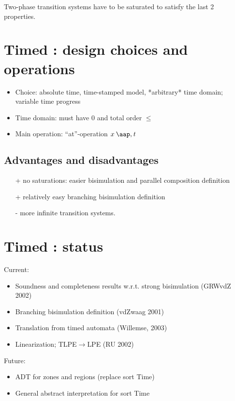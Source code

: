 \begin{slide}
\pause
Two-phase transition systems have to be saturated to satisfy the last 2 properties.
\newslide\section*{Timed \mcrl: design choices and operations}
\begin{itemize}
\item Choice: absolute time, time-stamped model, *arbitrary* time domain; variable time progress
\item Time domain: must have $0$ and total order $\leq$
\item Main operation: ``at''-operation $x\at t$
\end{itemize}
\pause
\subsection*{Advantages and disadvantages}
\begin{itemize}
\item[+] no saturations: easier bisimulation and parallel composition definition
\item[+] relatively easy branching bisimulation definition
\item[-] more infinite transition systems.
\end{itemize}
\newslide\section*{Timed \mcrl: status}
Current:
\begin{itemize}
\item Soundness and completeness results w.r.t. strong bisimulation (GRWvdZ 2002)
\item Branching bisimulation definition (vdZwaag 2001)
\item Translation from timed automata (Willemse, 2003)
\item Linearization; TLPE$\to$LPE (RU 2002)
\end{itemize}
\pause
Future:
\begin{itemize}
\item ADT for zones and regions (replace sort Time)
\item General abstract interpretation for sort Time
\end{itemize}

\end{slide}
